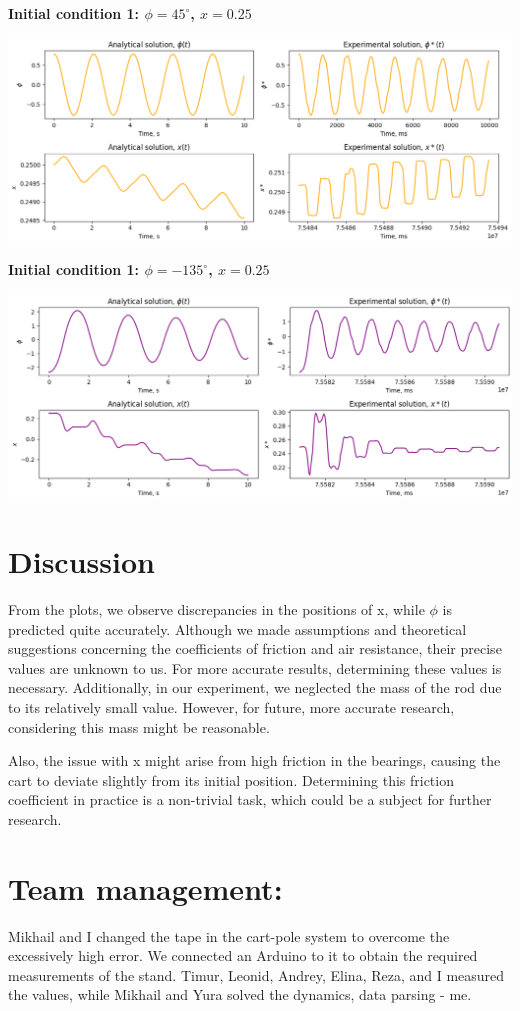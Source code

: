 \documentclass{article}
\begin{document}
\textbf{Initial condition 1: $\phi = 45^\circ$, $x = 0.25$}

\includegraphics*[scale=0.25]{graphics/res_comparison_init2.png}


\textbf{Initial condition 1: $\phi = -135^\circ$, $x = 0.25$}

\includegraphics*[scale=0.25]{graphics/res_comparison_init3.png}

\section{Discussion}

From the plots, we observe discrepancies in the positions of x, while $\phi$ is predicted quite accurately. Although we made assumptions and theoretical suggestions concerning the coefficients of friction and air resistance, their precise values are unknown to us. For more accurate results, determining these values is necessary. Additionally, in our experiment, we neglected the mass of the rod due to its relatively small value. However, for future, more accurate research, considering this mass might be reasonable.

Also, the issue with x might arise from high friction in the bearings, causing the cart to deviate slightly from its initial position. Determining this friction coefficient in practice is a non-trivial task, which could be a subject for further research.

\section{Team management:} Mikhail and I changed the tape in the cart-pole system to overcome the excessively high error. We connected an Arduino to it to obtain the required measurements of the stand. Timur, Leonid, Andrey, Elina, Reza, and I measured the values, while Mikhail and Yura solved the dynamics, data parsing - me.
\end{document}
